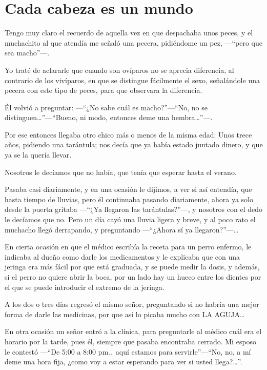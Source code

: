 \documentclass[letterpaper, 12pt]{book}
\begin{document}
\chapter{Cada cabeza es un mundo}
Tengo muy claro el recuerdo de aquella vez en que despachaba unos peces, y el muchachito al que atendía me señaló una pecera, pidiéndome un pez, ---``pero que sea macho''---.

Yo traté de aclararle que cuando son ovíparos no se aprecia diferencia, al contrario de los vivíparos, en que se distingue fácilmente el sexo, señalándole una pecera con este tipo de peces, para que observara la diferencia.

Él volvió a preguntar: ---``¿No sabe cuál es macho?''---``No, no se distinguen\ldots''---``Bueno, ni modo, entonces deme una hembra\ldots''---.

Por ese entonces llegaba otro chico más o menos de la misma edad: Unos trece años, pidiendo una tarántula; nos decía que ya había estado juntado dinero, y que ya se la quería llevar.

Nosotros le decíamos que no había, que tenía que esperar hasta el verano.

Pasaba casi diariamente, y en una ocasión le dijimos, a ver si así entendía, que hasta tiempo de lluvias, pero él continuaba pasando diariamente, ahora ya solo desde la puerta gritaba ---``¿Ya llegaron las tarántulas?''---, y nosotros con el dedo le decíamos que no. Pero un día cayó una lluvia ligera y breve, y al poco rato el muchacho llegó derrapando, y preguntando ---``¿Ahora sí ya llegaron?''---\ldots

En cierta ocasión en que el médico escribía la receta para un perro enfermo, le indicaba al dueño como darle los medicamentos y le explicaba que con una jeringa era más fácil por que está graduada, y se puede medir la dosis, y además, si el perro no quiere abrir la boca, por un lado hay un hueco entre los dientes por el que se puede introducir el extremo de la jeringa.

A los dos o tres días regresó el mismo señor, preguntando si no habría una mejor forma de darle las medicinas, por que así lo picaba mucho con LA AGUJA\ldots

En otra ocasión un señor entró a la clínica, para preguntarle al médico cuál era el horario por la tarde, pues él, siempre que pasaba encontraba cerrado. Mi esposo le contestó ---``De 5:00 a 8:00 pm..\ aquí estamos para servirle''---``No, no, a mí deme una hora fija, ¿como voy a estar esperando para ver si usted llega?\ldots''.
\end{document}
